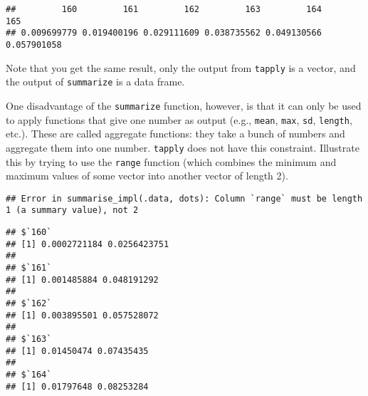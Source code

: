 \documentclass[]{book}
\newenvironment{Shaded}{\begin{snugshade}}{\end{snugshade}}
\newcommand{\KeywordTok}[1]{\textcolor[rgb]{0.13,0.29,0.53}{\textbf{#1}}}
\newcommand{\DataTypeTok}[1]{\textcolor[rgb]{0.13,0.29,0.53}{#1}}
\newcommand{\DecValTok}[1]{\textcolor[rgb]{0.00,0.00,0.81}{#1}}
\newcommand{\StringTok}[1]{\textcolor[rgb]{0.31,0.60,0.02}{#1}}
\newcommand{\CommentTok}[1]{\textcolor[rgb]{0.56,0.35,0.01}{\textit{#1}}}
\newcommand{\OperatorTok}[1]{\textcolor[rgb]{0.81,0.36,0.00}{\textbf{#1}}}
\newcommand{\NormalTok}[1]{#1}
\theoremstyle{definition}
\theoremstyle{definition}
\theoremstyle{definition}
\theoremstyle{remark}
\begin{document}
\begin{verbatim}
##         160         161         162         163         164         165 
## 0.009699779 0.019400196 0.029111609 0.038735562 0.049130566 0.057901058
\end{verbatim}

Note that you get the same result, only the output from \texttt{tapply}
is a vector, and the output of \texttt{summarize} is a data frame.

One disadvantage of the \texttt{summarize} function, however, is that it
can only be used to apply functions that give one number as output
(e.g., \texttt{mean}, \texttt{max}, \texttt{sd}, \texttt{length}, etc.).
These are called aggregate functions: they take a bunch of numbers and
aggregate them into one number. \texttt{tapply} does not have this
constraint. Illustrate this by trying to use the \texttt{range} function
(which combines the minimum and maximum values of some vector into
another vector of length 2).

\begin{Shaded}
\end{Shaded}

\begin{verbatim}
## Error in summarise_impl(.data, dots): Column `range` must be length 1 (a summary value), not 2
\end{verbatim}

\begin{Shaded}
\end{Shaded}

\begin{verbatim}
## $`160`
## [1] 0.0002721184 0.0256423751
## 
## $`161`
## [1] 0.001485884 0.048191292
## 
## $`162`
## [1] 0.003895501 0.057528072
## 
## $`163`
## [1] 0.01450474 0.07435435
## 
## $`164`
## [1] 0.01797648 0.08253284
\end{verbatim}
\end{document}
